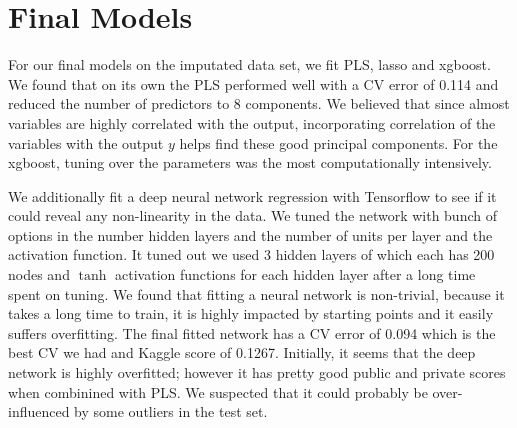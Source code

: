 \documentclass[12pt]{article}
\newcommand{\thanh}[1]{#1}
\begin{document}
\section{Final Models}

For our final models on the imputated data set, we fit PLS, lasso and xgboost. %
We found that on its own the PLS performed well with a CV error of 0.114 and reduced the number of predictors to 8 components. We believed that since almost variables are highly correlated with the output, incorporating correlation of the variables with the output $y$ helps find these good principal components. For the xgboost, tuning over the parameters was the most computationally intensively.


\thanh{We additionally fit a deep neural network regression with Tensorflow to see if it could reveal any non-linearity in the data. We tuned the network with bunch of options in the number hidden layers and the number of units per layer and the activation function. It tuned out we used 3 hidden layers of which each has 200 nodes and $\tanh$ activation functions for each hidden layer after a long time spent on tuning. We found that fitting a neural network is non-trivial, because it takes a long time to train, it is highly impacted by starting points and it easily suffers overfitting. The final fitted network has a CV error of 0.094 which is the best CV we had and Kaggle score of 0.1267. Initially, it seems that the deep network is highly overfitted; however it has pretty good public and private scores when combinined with PLS. We suspected that it could probably be over-influenced by some outliers in the test set.} 
\end{document}
